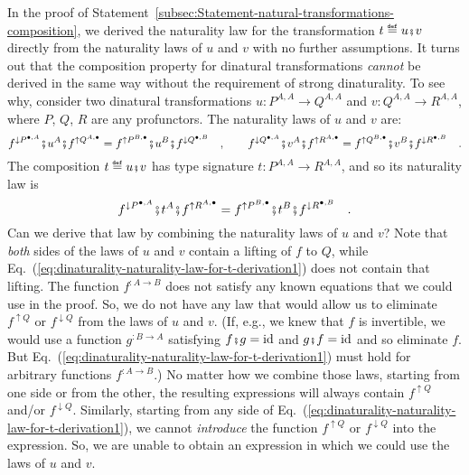 In the proof of Statement~\ref{subsec:Statement-natural-transformations-composition},
we derived the naturality law for the transformation $t\triangleq u\bef v$
directly from the naturality laws of $u$ and $v$ with no further
assumptions. It turns out that the composition property for dinatural
transformations \emph{cannot} be derived in the same way without the
requirement of strong dinaturality. To see why, consider two dinatural
transformations $u:P^{A,A}\rightarrow Q^{A,A}$ and $v:Q^{A,A}\rightarrow R^{A,A}$,
where $P$, $Q$, $R$ are any profunctors. The naturality laws of
$u$ and $v$ are:
\[
f^{\downarrow P^{\bullet,A}}\bef u^{A}\bef f^{\uparrow Q^{A,\bullet}}=f^{\uparrow P^{B,\bullet}}\bef u^{B}\bef f^{\downarrow Q^{\bullet,B}}\quad,\quad\quad f^{\downarrow Q^{\bullet,A}}\bef v^{A}\bef f^{\uparrow R^{A,\bullet}}=f^{\uparrow Q^{B,\bullet}}\bef v^{B}\bef f^{\downarrow R^{\bullet,B}}\quad.
\]
 The composition $t\triangleq u\bef v$ has type signature $t:P^{A,A}\rightarrow R^{A,A}$,
and so its naturality law is
\begin{equation}
f^{\downarrow P^{\bullet,A}}\bef t^{A}\bef f^{\uparrow R^{A,\bullet}}=f^{\uparrow P^{B,\bullet}}\bef t^{B}\bef f^{\downarrow R^{\bullet,B}}\quad.\label{eq:dinaturality-naturality-law-for-t-derivation1}
\end{equation}
Can we derive that law by combining the naturality laws of $u$ and
$v$? Note that \emph{both} sides of the laws of $u$ and $v$ contain
a lifting of $f$ to $Q$, while Eq.~(\ref{eq:dinaturality-naturality-law-for-t-derivation1})
does not contain that lifting. The function $f^{:A\rightarrow B}$
does not satisfy any known equations that we could use in the proof.
So, we do not have any law that would allow us to eliminate $f^{\uparrow Q}$
or $f^{\downarrow Q}$ from the laws of $u$ and $v$. (If, e.g.,
we knew that $f$ is invertible, we would use a function $g^{:B\rightarrow A}$
satisfying $f\bef g=\text{id}$ and $g\bef f=\text{id}$ and so eliminate
$f$. But Eq.~(\ref{eq:dinaturality-naturality-law-for-t-derivation1})
must hold for arbitrary functions $f^{:A\rightarrow B}$.) No matter
how we combine those laws, starting from one side or from the other,
the resulting expressions will always contain $f^{\uparrow Q}$ and/or
$f^{\downarrow Q}$. Similarly, starting from any side of Eq.~(\ref{eq:dinaturality-naturality-law-for-t-derivation1}),
we cannot \emph{introduce} the function $f^{\uparrow Q}$ or $f^{\downarrow Q}$
into the expression. So, we are unable to obtain an expression in
which we could use the laws of $u$ and $v$. %
\begin{comment}
precarious formatting
\end{comment}

